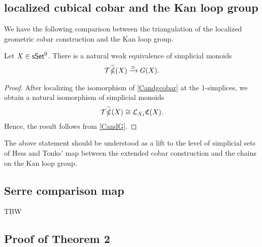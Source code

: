 \subsection{localized cubical cobar and the Kan loop group}

We have the following comparison between the triangulation of the localized geometric cobar construction and the Kan loop group.

\begin{corollary} \label{widehatgcobarandG}
	Let $X \in \mathsf{sSet}^0$.
	There is a natural weak equivalence of simplicial monoids
	$$\mathcal{T} \widehat{\operatorname{\mathbb{\Omega}}}(X) \xrightarrow{\simeq}G(X).$$
\end{corollary}

\begin{proof}
	After localizing the isomorphism of \cref{Candgcobar} at the $1$-simplices, we obtain a natural isomorphism of simplicial monoids
	$$\mathcal{T} \widehat{\operatorname{\mathbb{\Omega}}}(X) \cong \mathcal{L}_{X_1}\mathfrak{C}(X).$$
	Hence, the result follows from \cref{CandG}.
\end{proof}

The above statement should be understood as a lift to the level of simplicial sets of Hess and Tonks' map between the extended cobar construction and the chains on the Kan loop group.

\subsection{Serre comparison map}

TBW

\subsection{Proof of Theorem 2}


